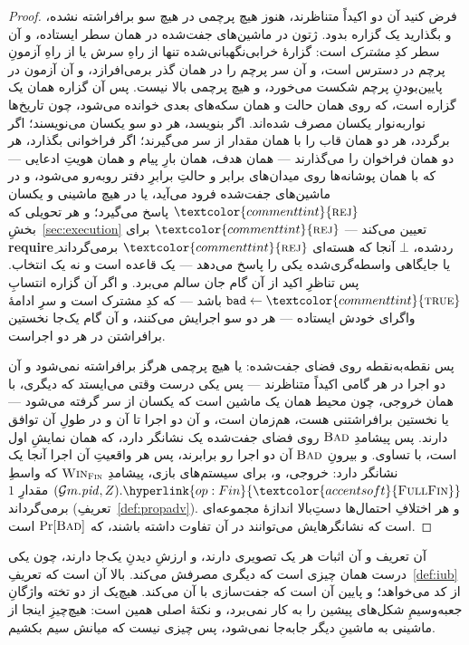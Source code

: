 \documentclass[10pt,oneside,openany]{book}
\newcommand{\PID}{\mathit{pid}}
\newcommand{\op}[1]{\textnormal{\textsc{#1}}}
\newcommand{\fopl}[1]{\hyperlink{op:#1}{\textcolor{accentsoft}{\op{Full}\op{#1}}}}
\newcommand{\atom}[1]{\textcolor{commenttint}{\op{#1}}}
\newcommand{\rej}{\atom{rej}}
\newcommand{\true}{\atom{true}}
\newcommand{\Gm}{\mathcal{G}m}
\newcommand{\Win}{\op{Win}}
\newcommand{\Bad}{\op{Bad}}
\newcommand{\none}{\bot}
\newcommand{\V}[1]{\mathtt{#1}}
\theoremstyle{accentdef}
\theoremstyle{accentplain}
\begin{document}
\begin{proof}
فرض کنید آن دو اکیداً متناظرند، هنوز هیچ پرچمی در هیچ سو برافراشته نشده، و
بگذارید یک گزاره بدود. ژتون در ماشین‌های جفت‌شده در همان سطر ایستاده، و آن
سطر کدِ \emph{مشترک} است: گزارهٔ خرابی‌نگهبانی‌شده تنها از راهِ سرش یا از
راهِ آزمونِ پرچم در دسترس است، و آن سر پرچم را در همان گذر برمی‌افرازد، و آن
آزمون در پایین‌بودنِ پرچم شکست می‌خورد، و هیچ پرچمی بالا نیست. پس آن گزاره
همان یک گزاره است، که روی همان حالت و همان سکه‌های بعدی خوانده می‌شود، چون
تاریخ‌ها نوار‌به‌نوار یکسان مصرف شده‌اند. اگر بنویسد، هر دو سو یکسان
می‌نویسند؛ اگر برگردد، هر دو همان قاب را با همان مقدار از سر می‌گیرند؛ اگر
فراخوانی بگذارد، هر دو همان فراخوان را می‌گذارند --- همان هدف، همان بارِ
پیام و همان هویتِ ادعایی --- که با همان پوشانه‌ها روی میدان‌های برابر و
حالتِ برابرِ دفتر روبه‌رو می‌شود، و در ماشین‌های جفت‌شده فرود می‌آید، یا در
هیچ ماشینی و یکسان $\rej$ پاسخ می‌گیرد؛ و هر تحویلی که
بخشِ~\ref{sec:execution} تعیین می‌کند --- $\rej$ برای \textbf{require}ِ
ردشده، $\none$ آنجا که هسته‌ای $\rej$ برمی‌گرداند یا جایگاهی
واسطه‌گری‌شده یکی را پاسخ می‌دهد --- یک قاعده است و نه یک انتخاب. پس تناظرِ
اکید از آن گام جان سالم می‌برد. و اگر آن گزاره انتسابِ $\V{bad} \gets
\true$ باشد --- که کدِ مشترک است و سرِ ادامهٔ واگرای خودش ایستاده --- هر دو
سو اجرایش می‌کنند، و آن گام یک‌جا نخستین برافراشتن در هر دو اجراست.

پس نقطه‌به‌نقطه روی فضای جفت‌شده: یا هیچ پرچمی هرگز برافراشته نمی‌شود و آن
دو اجرا در هر گامی اکیداً متناظرند --- پس یکی درست وقتی می‌ایستد که دیگری،
با همان خروجی، چون محیط همان یک ماشین است که یکسان از سر گرفته می‌شود --- یا
نخستین برافراشتنی هست، هم‌زمان است، و آن دو اجرا تا آن و در طولِ آن توافق
دارند. پس پیشامدِ $\Bad$ روی فضای جفت‌شده یک نشانگر دارد، که همان نمایشِ
اول است، با تساوی. و بیرونِ $\Bad$ آن دو اجرا رو برابرند، پس هر واقعیتِ آن
اجرا آنجا یک نشانگر دارد: خروجی، و، برای سیستم‌های بازی، پیشامدِ
$\Win_{\op{Fin}}$ که واسطِ $(\Gm.\PID,Z).\fopl{Fin}$ مقدارِ $1$ برمی‌گرداند
(تعریفِ~\ref{def:propadv}). و هر اختلافِ احتمال‌ها دستِ‌بالا اندازهٔ
مجموعه‌ای است که نشانگرهایش می‌توانند در آن تفاوت داشته باشند، که
$\Pr[\Bad]$ است.
\end{proof}

آن تعریف و آن اثبات هر یک تصویری دارند، و ارزشِ دیدنِ یک‌جا دارند، چون یکی
درست همان چیزی است که دیگری مصرفش می‌کند. بالا آن است که
تعریفِ~\ref{def:iub} از کد می‌خواهد؛ و پایین آن است که جفت‌سازی با آن
می‌کند. هیچ‌یک از دو تخته واژگانِ جعبه‌و‌سیمِ شکل‌های پیشین را به کار
نمی‌برد، و نکتهٔ اصلی همین است: هیچ‌چیزِ اینجا از ماشینی به ماشینِ دیگر
جابه‌جا نمی‌شود، پس چیزی نیست که میانش سیم بکشیم.
\end{document}
